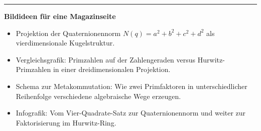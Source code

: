 \documentclass[11pt,a4paper]{article}
\begin{document}
	\vspace{0.8em}
	\hrule
	\vspace{1em}
	
	\noindent\textbf{Bildideen für eine Magazinseite}
	
	\begin{itemize}[leftmargin=1.5em]
		\item Projektion der Quaternionennorm \(N(q)=a^2+b^2+c^2+d^2\) als vierdimensionale Kugelstruktur.
		\item Vergleichsgrafik: Primzahlen auf der Zahlengeraden versus Hurwitz-Primzahlen in einer dreidimensionalen Projektion.
		\item Schema zur Metakommutation: Wie zwei Primfaktoren in unterschiedlicher Reihenfolge verschiedene algebraische Wege erzeugen.
		\item Infografik: Vom Vier-Quadrate-Satz zur Quaternionennorm und weiter zur Faktorisierung im Hurwitz-Ring.
	\end{itemize}
	
\end{document}
